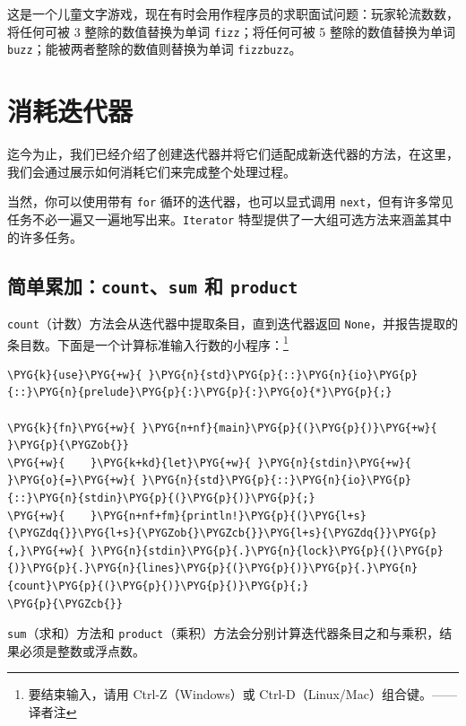 这是一个儿童文字游戏，现在有时会用作程序员的求职面试问题：玩家轮流数数，将任何可被 3 整除的数值替换为单词 \texttt{fizz}；将任何可被 5 整除的数值替换为单词 \texttt{buzz}；能被两者整除的数值则替换为单词 \texttt{fizzbuzz}。

\section{消耗迭代器}

迄今为止，我们已经介绍了创建迭代器并将它们适配成新迭代器的方法，在这里，我们会通过展示如何消耗它们来完成整个处理过程。

当然，你可以使用带有 \texttt{for} 循环的迭代器，也可以显式调用 \texttt{next}，但有许多常见任务不必一遍又一遍地写出来。\texttt{Iterator} 特型提供了一大组可选方法来涵盖其中的许多任务。

\subsection{简单累加：\texttt{count}、\texttt{sum} 和 \texttt{product}}

\texttt{count}（计数）方法会从迭代器中提取条目，直到迭代器返回 \texttt{None}，并报告提取的条目数。下面是一个计算标准输入行数的小程序：\footnote{要结束输入，请用 Ctrl-Z（Windows）或 Ctrl-D（Linux/\allowbreak{}Mac）组合键。——译者注}

\begin{Verbatim}[commandchars=\\\{\},breaklines=true,breakanywhere=true,fontsize=\codefont,xleftmargin=17bp]
\PYG{k}{use}\PYG{+w}{ }\PYG{n}{std}\PYG{p}{::}\PYG{n}{io}\PYG{p}{::}\PYG{n}{prelude}\PYG{p}{:}\PYG{p}{:}\PYG{o}{*}\PYG{p}{;}

\PYG{k}{fn}\PYG{+w}{ }\PYG{n+nf}{main}\PYG{p}{(}\PYG{p}{)}\PYG{+w}{ }\PYG{p}{\PYGZob{}}
\PYG{+w}{    }\PYG{k+kd}{let}\PYG{+w}{ }\PYG{n}{stdin}\PYG{+w}{ }\PYG{o}{=}\PYG{+w}{ }\PYG{n}{std}\PYG{p}{::}\PYG{n}{io}\PYG{p}{::}\PYG{n}{stdin}\PYG{p}{(}\PYG{p}{)}\PYG{p}{;}
\PYG{+w}{    }\PYG{n+nf+fm}{println!}\PYG{p}{(}\PYG{l+s}{\PYGZdq{}}\PYG{l+s}{\PYGZob{}\PYGZcb{}}\PYG{l+s}{\PYGZdq{}}\PYG{p}{,}\PYG{+w}{ }\PYG{n}{stdin}\PYG{p}{.}\PYG{n}{lock}\PYG{p}{(}\PYG{p}{)}\PYG{p}{.}\PYG{n}{lines}\PYG{p}{(}\PYG{p}{)}\PYG{p}{.}\PYG{n}{count}\PYG{p}{(}\PYG{p}{)}\PYG{p}{)}\PYG{p}{;}
\PYG{p}{\PYGZcb{}}
\end{Verbatim}

\texttt{sum}（求和）方法和 \texttt{product}（乘积）方法会分别计算迭代器条目之和与乘积，结果必须是整数或浮点数。

